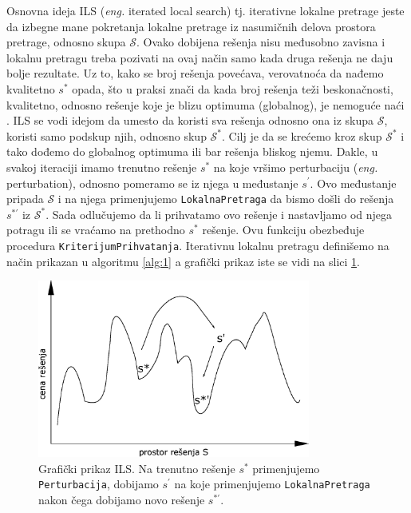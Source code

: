 \documentclass[a4paper]{article}
\newcommand{\sstar}[0]{$\textit{s}^*$}
\newcommand{\squote}[0]{$\textit{s}^\prime$}
\renewcommand{\S}[0]{$\mathcal{S}$} %
\newcommand{\Sstar}[0]{$\mathcal{S}^{*}$}
\newcommand{\eng}[1]{(\textit{eng.} #1)}
\newcommand{\lokalna}[0]{\small{\texttt{LokalnaPretraga}}}
\newcommand{\kriterijum}[0]{\small{\texttt{KriterijumPrihvatanja}}}
\newcommand{\perturbacija}[0]{\small{\texttt{Perturbacija}}}
\begin{document}
Osnovna ideja ILS \eng{iterated local search} tj. iterativne lokalne pretrage jeste da izbegne mane pokretanja lokalne pretrage iz nasumičnih delova prostora pretrage, 
odnosno skupa \S{}. Ovako dobijena rešenja nisu međusobno zavisna i lokalnu pretragu treba pozivati na ovaj način samo kada druga rešenja ne daju bolje rezultate.\footnotemark
{} 
Uz to, kako se broj rešenja povećava, verovatnoća da nađemo kvalitetno \sstar{} opada, što u praksi znači da kada broj rešenja teži beskonačnosti, kvalitetno, odnosno rešenje koje je blizu optimuma (globalnog), je 
nemoguće naći \cite{handbookOfMetaheuristics}. ILS se vodi idejom da umesto da koristi sva rešenja odnosno ona iz skupa \S{}, koristi samo podskup njih, odnosno skup \Sstar{}. 
Cilj je da se krećemo kroz skup \Sstar{} i tako dođemo do globalnog optimuma ili bar rešenja bliskog njemu.
Dakle, u svakoj iteraciji imamo trenutno rešenje \sstar{} na koje vršimo perturbaciju \eng{perturbation}, odnosno pomeramo se iz njega u međustanje 
\squote{}. Ovo međustanje pripada \S{} i na njega primenjujemo \lokalna{} da bismo došli do rešenja $\textit{s}^{*\prime}$ iz \Sstar{}. Sada odlučujemo da li prihvatamo ovo rešenje i nastavljamo od njega potragu ili 
se vraćamo na prethodno \sstar{} rešenje. Ovu funkciju obezbeđuje procedura \kriterijum{}.
Iterativnu lokalnu pretragu definišemo na način prikazan u algoritmu \ref{alg:1} a grafički prikaz iste se vidi na slici \ref{figure:iterativna}.

\begin{figure}[h!]
  \centering
  \includegraphics[width=0.8\textwidth]{slika.eps}
  \caption{Grafički prikaz ILS. Na trenutno rešenje \sstar{} primenjujemo \perturbacija{}, dobijamo \squote{} na koje primenjujemo \lokalna{} nakon čega dobijamo novo rešenje $\textit{s}^{*\prime{}}$.}
  \label{figure:iterativna}
\end{figure}
\end{document}
